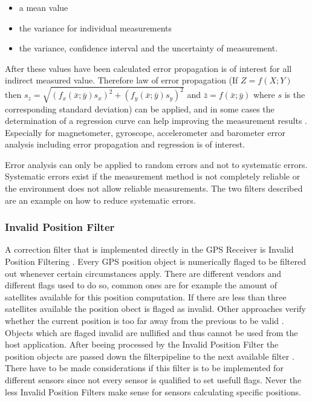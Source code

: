 \begin{itemize}
	\item a mean value 
	\item the variance for individual measurements
	\item the variance, confidence interval and the uncertainty of measurement.
\end{itemize}

After these values have been calculated error propagation is of interest for all indirect measured value. Therefore law of error propagation (If $Z = f(X; Y)$ then $s_z = \sqrt{(f_x(\bar x; \bar y) s_x)^2 + (f_y(\bar x; \bar y) s_y)^2}$ and $\bar z = f(\bar x; \bar y)$ where $s$ is the corresponding standard deviation) can be applied, and in some cases the determination of a regression curve can help improving the measurement results \parencite{papula}. Especially for magnetometer, gyroscope, accelerometer and barometer error analysis including error propagation and regression is of interest. 

Error analysis can only be applied to random errors and not to systematic errors. Systematic errors exist if the measurement method is not completely reliable or the environment does not allow reliable measurements. The two filters described are an example on how to reduce systematic errors.

\subsubsection{Invalid Position Filter}
A correction filter that is implemented directly in the GPS Receiver is Invalid Position Filtering \parencite{mapCraft}. Every GPS position object is numerically flaged to be filtered out whenever certain circumstances apply. There are different vendors and different flags used to do so, common ones are for example the amount of satellites available for this position computation. If there are less than three satellites available the position obect is flaged as invalid. Other approaches verify whether the current position is too far away from the previous to be valid \parencite{mapCraft}. Objects which are flaged invalid are nullified and thus cannot be used from the host application. After beeing processed by the Invalid Position Filter the position objects are passed down the filterpipeline to the next available filter \parencite{mapCraft}. There have to be made considerations if this filter is to be implemented for different sensors since not every sensor is qualified to set usefull flags. Never the less Invalid Position Filters make sense for sensors calculating specific positions.


